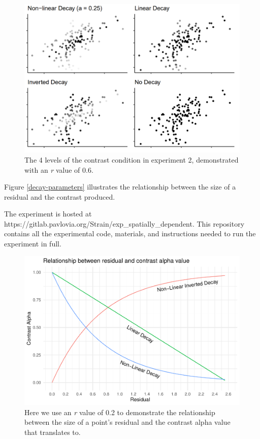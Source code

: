 \documentclass[preprint, 3p,
authoryear]{elsarticle} %
\begin{document}
\begin{figure}

\includegraphics[width=1\linewidth]{plot_examples/spatially_dependent_plot_examples} \hfill{}

\caption{\label{e2-example-plots}The 4 levels of the contrast condition in experiment 2, demonstrated with an \textit{r} value of 0.6.}\label{fig:e2-example-plots}
\end{figure}

Figure \ref{decay-parameters} illustrates the relationship between the
size of a residual and the contrast produced.

The experiment is hosted at
https://gitlab.pavlovia.org/Strain/exp\_spatially\_dependent. This
repository contains all the experimental code, materials, and
instructions needed to run the experiment in full.

\begin{figure}
\includegraphics[width=1\linewidth]{contrast_and_scatterplots_files/figure-latex/decay-parameters-1} \caption{\label{decay-parameters}Here we use an \textit{r} value of 0.2 to demonstrate the relationship between the size of a point's residual and the contrast alpha value that translates to.}\label{fig:decay-parameters}
\end{figure}
\end{document}

